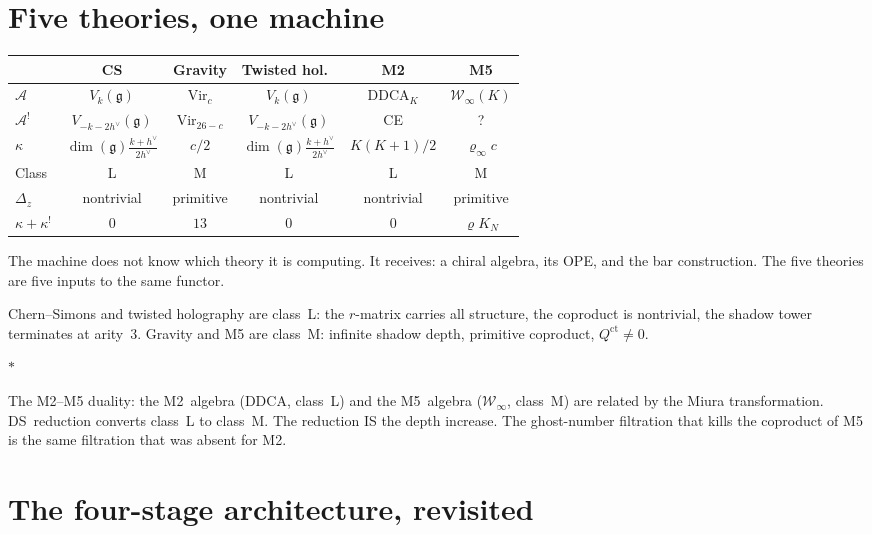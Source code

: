 \documentclass[11pt]{article}
\newcommand{\cA}{\mathcal{A}}
\newcommand{\cW}{\mathcal{W}}
\newcommand{\fg}{\mathfrak{g}}
\newcommand{\sep}{\bigskip\begin{center}$*$\end{center}\medskip}
\begin{document}
\section{Five theories, one machine}
\label{sec:five-theories}

\begin{center}
\small
\renewcommand{\arraystretch}{1.15}
\begin{tabular}{@{}lccccc@{}}
& CS & Gravity & Twisted hol.\ & M2 & M5 \\
\hline
$\cA$ & $V_k(\fg)$ & $\mathrm{Vir}_c$
  & $V_k(\fg)$ & DDCA$_K$ & $\cW_\infty(K)$ \\[3pt]
$\cA^!$ & $V_{-k-2h^\vee}(\fg)$ & $\mathrm{Vir}_{26-c}$
  & $V_{-k-2h^\vee}(\fg)$ & CE & ? \\[3pt]
$\kappa$ & $\dim(\fg)\frac{k+h^\vee}{2h^\vee}$
  & $c/2$ & $\dim(\fg)\frac{k+h^\vee}{2h^\vee}$
  & $K(K{+}1)/2$ & $\varrho_\infty c$ \\[3pt]
Class & L & M & L & L & M \\[3pt]
$\Delta_z$ & nontrivial & primitive & nontrivial
  & nontrivial & primitive \\[3pt]
$\kappa + \kappa^!$ & $0$ & $13$ & $0$ & $0$
  & $\varrho K_N$
\end{tabular}
\end{center}

\medskip

The machine does not know which theory it is computing.  It
receives: a chiral algebra, its OPE, and the bar construction.
The five theories are five inputs to the same functor.

Chern--Simons and twisted holography are class~L: the $r$-matrix
carries all structure, the coproduct is nontrivial, the shadow
tower terminates at arity~$3$.  Gravity and M5 are class~M:
infinite shadow depth, primitive coproduct,
$Q^{\mathrm{ct}} \neq 0$.

\sep

The M2--M5 duality: the M2~algebra (DDCA, class~L) and the
M5~algebra ($\cW_\infty$, class~M) are related by the Miura
transformation.  DS~reduction converts class~L to class~M.
The reduction IS the depth increase.  The ghost-number filtration
that kills the coproduct of M5 is the same filtration that was
absent for M2.


\section{The four-stage architecture, revisited}
\label{sec:four-stages-revisited}
\end{document}
